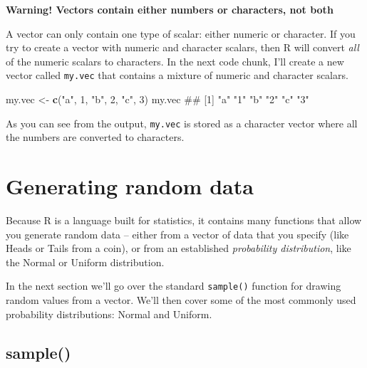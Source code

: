 \documentclass[]{book}
\newenvironment{Shaded}{\begin{snugshade}}{\end{snugshade}}
\newcommand{\KeywordTok}[1]{\textcolor[rgb]{0.13,0.29,0.53}{\textbf{{#1}}}}
\newcommand{\DecValTok}[1]{\textcolor[rgb]{0.00,0.00,0.81}{{#1}}}
\newcommand{\StringTok}[1]{\textcolor[rgb]{0.31,0.60,0.02}{{#1}}}
\newcommand{\NormalTok}[1]{{#1}}
\theoremstyle{definition}
\theoremstyle{definition}
\theoremstyle{remark}
\begin{document}
\textbf{Warning! Vectors contain either numbers or characters, not both}

A vector can only contain one type of scalar: either numeric or
character. If you try to create a vector with numeric and character
scalars, then R will convert \emph{all} of the numeric scalars to
characters. In the next code chunk, I'll create a new vector called
\texttt{my.vec} that contains a mixture of numeric and character
scalars.

\begin{Shaded}
\begin{Highlighting}[]
\NormalTok{my.vec <-}\StringTok{ }\KeywordTok{c}\NormalTok{(}\StringTok{"a"}\NormalTok{, }\DecValTok{1}\NormalTok{, }\StringTok{"b"}\NormalTok{, }\DecValTok{2}\NormalTok{, }\StringTok{"c"}\NormalTok{, }\DecValTok{3}\NormalTok{)}
\NormalTok{my.vec}
\NormalTok{## [1] "a" "1" "b" "2" "c" "3"}
\end{Highlighting}
\end{Shaded}

As you can see from the output, \texttt{my.vec} is stored as a character
vector where all the numbers are converted to characters.

\section{Generating random data}\label{generating-random-data}

Because R is a language built for statistics, it contains many functions
that allow you generate random data -- either from a vector of data that
you specify (like Heads or Tails from a coin), or from an established
\emph{probability distribution}, like the Normal or Uniform
distribution.

In the next section we'll go over the standard \texttt{sample()}
function for drawing random values from a vector. We'll then cover some
of the most commonly used probability distributions: Normal and Uniform.

\subsection{sample()}\label{sample}
\end{document}
